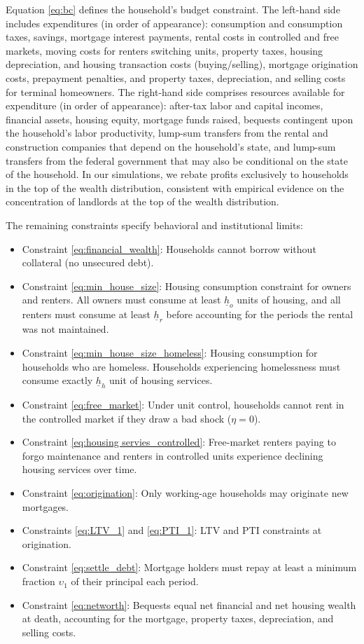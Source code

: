 \documentclass[parskip=full]{article}
\begin{document}
Equation \eqref{eq:bc} defines the household's budget constraint. The left-hand side includes expenditures (in order of appearance): consumption and consumption taxes, savings, mortgage interest payments, rental costs in controlled and free markets, moving costs for renters switching units, property taxes, housing depreciation, and housing transaction costs (buying/selling), mortgage origination costs, prepayment penalties, and property taxes, depreciation, and selling costs for terminal homeowners. The right-hand side comprises resources available for expenditure (in order of appearance): after-tax labor and capital incomes, financial assets, housing equity, mortgage funds raised, bequests contingent upon the household's labor productivity, lump-sum transfers from the rental and construction companies that depend on the household's state, and lump-sum transfers from the federal government that may also be conditional on the state of the household. In our simulations, we rebate profits exclusively to households in the top of the wealth distribution, consistent with empirical evidence on the concentration of landlords at the top of the wealth distribution.

The remaining constraints specify behavioral and institutional limits: 
\begin{itemize}
    \item Constraint \eqref{eq:financial_wealth}: Households cannot borrow without collateral (no unsecured debt).
    \item Constraint \eqref{eq:min_house_size}: Housing consumption constraint for owners and renters. All owners must consume at least $\underline{h}_{o}$ units of housing, and all renters must consume at least $\underline{h}_{r}$ before accounting for the periods the rental was not maintained.
    \item Constraint \eqref{eq:min_house_size_homeless}: Housing consumption for households who are homeless. Households experiencing homelessness must consume exactly $\underline{h}_{h}$ unit of housing services.
    \item Constraint \eqref{eq:free_market}: Under unit control, households cannot rent in the controlled market if they draw a bad shock ($\eta=0$).
    \item Constraint \eqref{eq:housing servies_controlled}: Free-market renters paying to forgo maintenance and renters in controlled units experience declining housing services over time.  
    \item Constraint \eqref{eq:origination}: Only working-age households may originate new mortgages.
    \item Constraints \eqref{eq:LTV_1} and \eqref{eq:PTI_1}: LTV and PTI constraints at origination.
    \item Constraint \eqref{eq:settle_debt}: Mortgage holders must repay at least a minimum fraction $\upsilon_{1}$ of their principal each period.
    \item Constraint \eqref{eq:networth}: Bequests equal net financial and net housing wealth at death, accounting for the mortgage, property taxes, depreciation, and selling costs.
\end{itemize} 
\end{document}
